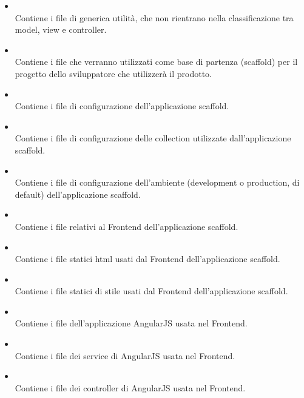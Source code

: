 \begin{itemize}
 \item \textbf{} \\
	Contiene i file di generica utilità, che non rientrano nella classificazione tra model, view e controller.

 \item \textbf{} \\
	Contiene i file che verranno utilizzati come base di partenza (scaffold) per il progetto dello sviluppatore che utilizzerà il prodotto.

 \item \textbf{} \\
	Contiene i file di configurazione dell'applicazione scaffold.

 \item \textbf{} \\
	Contiene i file di configurazione delle collection utilizzate dall'applicazione scaffold.

 \item \textbf{} \\
	Contiene i file di configurazione dell'ambiente (development o production, di default) dell'applicazione scaffold.

 \item \textbf{} \\
	Contiene i file relativi al Frontend dell'applicazione scaffold.

 \item \textbf{} \\
	Contiene i file statici html usati dal Frontend dell'applicazione scaffold.

 \item \textbf{} \\
	Contiene i file statici di stile usati dal Frontend dell'applicazione scaffold.

 \item \textbf{} \\
	Contiene i file dell'applicazione AngularJS usata nel Frontend.

 \item \textbf{} \\
	Contiene i file dei service di AngularJS usata nel Frontend.

 \item \textbf{} \\
	Contiene i file dei controller di AngularJS usata nel Frontend.


\end{itemize}
